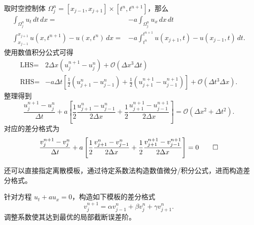 \begin{solution*}
    取时空控制体 $\Omega_j^n = [x_{j-1},x_{j+1}] \times [t^n,t^{n+1}]$，那么
    \begin{align*}
        \int_{\Omega_j^n} u_t\,dt\,dx ={}                        & - a \int_{\Omega_j^n} u_x\,dx\,dt \\
        \int_{x_{j-1}}^{x_{j+1}} u(x,t^{n+1}) - u(x,t^n)\,dx ={} &
        - a \int_{t^n}^{t^{n+1}} u(x_{j+1},t) - u(x_{j-1},t) \,dt.
    \end{align*}
    使用数值积分公式可得
    \begin{align*}
        \text{LHS} ={} & 2 \Delta x (u_j^{n+1} - u_j^n) +  \mathcal{O}(\Delta x^3 \Delta t) \\
        \text{RHS} ={} & - a \Delta t
        \left[
            \frac12 (u_{j+1}^n - u_{j-1}^n) + \frac12 (u_{j+1}^{n+1} - u_{j-1}^{n+1})
            \right] + \mathcal{O}(\Delta t^3 \Delta x).
    \end{align*}
    整理得到
    \[
        \frac{u_{j}^{n+1} - u_j^n}{\Delta t}
        + a \left[ \frac12 \frac{u_{j+1}^n - u_{j-1}^n}{2\Delta x} + \frac12 \frac{u_{j+1}^{n+1} - u_{j-1}^{n+1}}{2\Delta x} \right]
        = \mathcal{O}(\Delta x^2 + \Delta t^2).
    \]
    对应的差分格式为
    \[
        \frac{v_{j}^{n+1} - v_j^n}{\Delta t}
        + a \left[ \frac12 \frac{v_{j+1}^n - v_{j-1}^n}{2\Delta x} + \frac12 \frac{v_{j+1}^{n+1} - v_{j-1}^{n+1}}{2\Delta x} \right] = 0 \qedhere
    \]
\end{solution*}



还可以直接指定离散模板，通过待定系数法构造数值微分/积分公式，进而构造差分格式。

\begin{example}
    针对方程 $u_t + a u_x = 0$，构造如下模板的差分格式
    \[
        v_j^{n+1} = \alpha v_{j-1}^n + \beta v_j^n + \gamma v_{j+1}^n.
    \]
    调整系数使其达到最优的局部截断误差阶。
\end{example}

